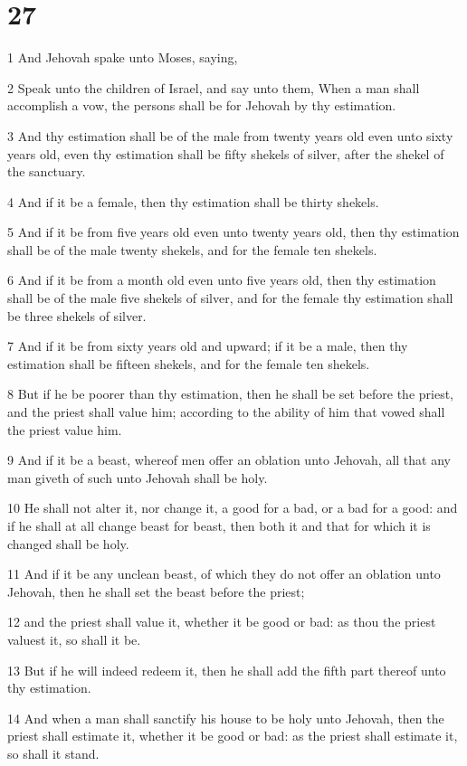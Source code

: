\chapter{27}

\par 1 And Jehovah spake unto Moses, saying,
\par 2 Speak unto the children of Israel, and say unto them, When a man shall accomplish a vow, the persons shall be for Jehovah by thy estimation.
\par 3 And thy estimation shall be of the male from twenty years old even unto sixty years old, even thy estimation shall be fifty shekels of silver, after the shekel of the sanctuary.
\par 4 And if it be a female, then thy estimation shall be thirty shekels.
\par 5 And if it be from five years old even unto twenty years old, then thy estimation shall be of the male twenty shekels, and for the female ten shekels.
\par 6 And if it be from a month old even unto five years old, then thy estimation shall be of the male five shekels of silver, and for the female thy estimation shall be three shekels of silver.
\par 7 And if it be from sixty years old and upward; if it be a male, then thy estimation shall be fifteen shekels, and for the female ten shekels.
\par 8 But if he be poorer than thy estimation, then he shall be set before the priest, and the priest shall value him; according to the ability of him that vowed shall the priest value him.
\par 9 And if it be a beast, whereof men offer an oblation unto Jehovah, all that any man giveth of such unto Jehovah shall be holy.
\par 10 He shall not alter it, nor change it, a good for a bad, or a bad for a good: and if he shall at all change beast for beast, then both it and that for which it is changed shall be holy.
\par 11 And if it be any unclean beast, of which they do not offer an oblation unto Jehovah, then he shall set the beast before the priest;
\par 12 and the priest shall value it, whether it be good or bad: as thou the priest valuest it, so shall it be.
\par 13 But if he will indeed redeem it, then he shall add the fifth part thereof unto thy estimation.
\par 14 And when a man shall sanctify his house to be holy unto Jehovah, then the priest shall estimate it, whether it be good or bad: as the priest shall estimate it, so shall it stand.
